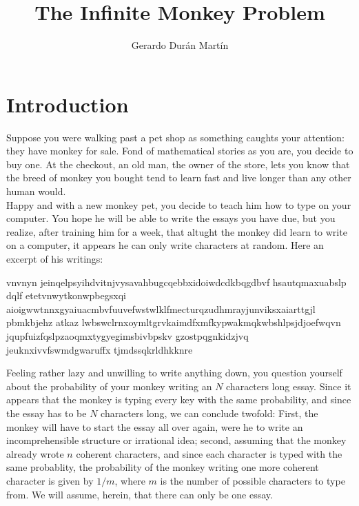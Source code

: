 \documentclass{article}
\title{The Infinite Monkey Problem}
\author{Gerardo Durán Martín}
\begin{document}
\maketitle
\tableofcontents{}

\newpage

\section{Introduction}
Suppose you were walking past a pet shop as something caughts your attention: they have monkey for sale. Fond of mathematical stories as you are, you decide to buy one. At the checkout, an old man, the owner of the store, lets you know that the breed of monkey you bought tend to learn fast and live longer than any other human would.\\

Happy and with a new monkey pet, you decide to teach him how to type on your computer. You hope he will be able to write the essays you have due, but you realize, after training him for a week, that altught the monkey did learn to write on a computer, it appears he can only write characters at random. Here an excerpt of his writings:

\begin{displayquote}
    vnvnyn jeinqelpsyihdvitnjvysavahbugcqebbxidoiwdcdkbqgdbvf hsautqmaxuabslp  dqlf etetvnwytkonwpbegsxqi aioigwwtnnxgyaiuacmbvfuuvefwstwlklfmecturqzudhmrayjunviksxaiarttgjl pbmkbjehz atkaz lwbswclrnxoymltgrvkaimdfxmfkypwakmqkwbshlpsjdjoefwqvn jqupfuizfqslpzaoqmxtygyegimsbivbpskv gzostpqgnkidzjvq  jeuknxivvfswmdgwaruffx tjmdssqkrldhkknre
\end{displayquote}

Feeling rather lazy and unwilling to write anything down, you question yourself about the probability of your monkey writing an $N$ characters long essay. Since it appears that the monkey is typing every key with the same probability, and since the essay has to be $N$ characters long, we can conclude twofold: First, the monkey will have to start the essay all over again, were he to write an incomprehensible structure or irrational idea; second, assuming that the monkey already wrote $n$ coherent characters, and since each character is typed with the same probablity, the probability of the monkey writing one more coherent character is given by $1/m$, where $m$ is the number of possible characters to type from. We will assume, herein, that there can only be one  essay. \\ 
\end{document}
